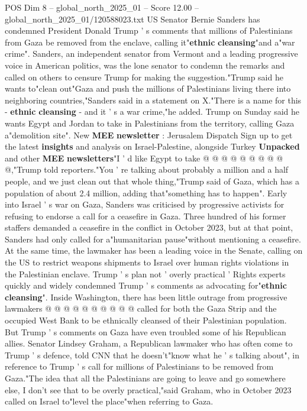 \begin{textsample}{POS Dim 8 – global\_north\_2025\_01 – Score 12.00 – global\_north\_2025\_01/120588023.txt}  \label{ex:f8_pos_110}
US Senator Bernie Sanders has condemned President Donald Trump ' s comments that millions of Palestinians from Gaza be removed from the enclave, calling it"\textbf{ethnic} \textbf{cleansing}"and a"war crime".
Sanders, an independent senator from Vermont and a leading progressive voice in American politics, was the lone senator to condemn the remarks and called on others to censure Trump for making the suggestion."Trump said he wants to"clean out"Gaza and push the millions of Palestinians living there into neighboring countries,"Sanders said in a statement on X."There is a name for this - \textbf{ethnic} \textbf{cleansing} - and it ' s a war crime,"he added.
Trump on Sunday said he wants Egypt and Jordan to take in Palestinians from the territory, calling Gaza a"demolition site".
New \textbf{MEE} \textbf{newsletter} : Jerusalem Dispatch Sign up to get the latest \textbf{insights} and analysis on Israel-Palestine, alongside Turkey \textbf{Unpacked} and other \textbf{MEE} \textbf{newsletters}"I ' d like Egypt to take @ @ @ @ @ @ @ @ @ @,"Trump told reporters."You ' re talking about probably a million and a half people, and we just clean out that whole thing,"Trump said of Gaza, which has a population of about 2.4 million, adding that"something has to happen".
Early into Israel ' s war on Gaza, Sanders was criticised by progressive activists for refusing to endorse a call for a ceasefire in Gaza.
Three hundred of his former staffers demanded a ceasefire in the conflict in October 2023, but at that point, Sanders had only called for a"humanitarian pause"without mentioning a ceasefire.
At the same time, the lawmaker has been a leading voice in the Senate, calling on the US to restrict weapons shipments to Israel over human rights violations in the Palestinian enclave.
Trump ' s plan not ' overly practical ' Rights experts quickly and widely condemned Trump ' s comments as advocating for"\textbf{ethnic} \textbf{cleansing}".
Inside Washington, there has been little outrage from progressive lawmakers @ @ @ @ @ @ @ @ @ @ called for both the Gaza Strip and the occupied West Bank to be ethnically cleansed of their Palestinian population.
But Trump ' s comments on Gaza have even troubled some of his Republican allies.
Senator Lindsey Graham, a Republican lawmaker who has often come to Trump ' s defence, told CNN that he doesn't"know what he ' s talking about", in reference to Trump ' s call for millions of Palestinians to be removed from Gaza."The idea that all the Palestinians are going to leave and go somewhere else, I don't see that to be overly practical,"said Graham, who in October 2023 called on Israel to"level the place"when referring to Gaza.

\end{textsample}
